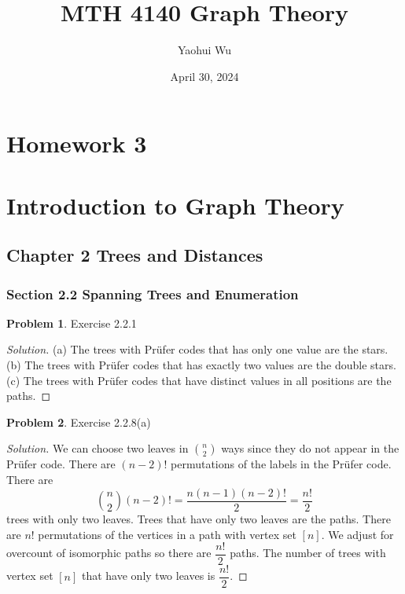\documentclass[12pt]{article}
\title{MTH 4140 Graph Theory}
\author{Yaohui Wu}
\date{April 30, 2024}
\theoremstyle{definition}
\newtheorem{problem}{Problem}
\newenvironment*{solution}{\begin{proof}[Solution]}{\end{proof}}
\begin{document}
\maketitle
\section*{Homework 3}
\section*{Introduction to Graph Theory}

\subsection*{Chapter 2 Trees and Distances}
\subsubsection*{Section 2.2 Spanning Trees and Enumeration}
\begin{problem}
    Exercise 2.2.1
\end{problem}
\begin{solution}
    (a) The trees with Prüfer codes that has only one value are the stars. (b)
    The trees with Prüfer codes that has exactly two values are the double
    stars. (c) The trees with Prüfer codes that have distinct values in all
    positions are the paths.
\end{solution}
\begin{problem}
    Exercise 2.2.8(a)
\end{problem}
\begin{solution}
    We can choose two leaves in \(\binom{n}{2}\) ways since they do not appear
    in the Prüfer code. There are \((n-2)!\) permutations of the labels in the
    Prüfer code. There are
    \[\binom{n}{2}(n-2)! = \frac{n(n-1)(n-2)!}{2} = \frac{n!}{2}\]
    trees with only two leaves. Trees that have only two leaves are
    the paths. There are \(n!\) permutations of the vertices in a path with
    vertex set \([n]\). We adjust for overcount of isomorphic paths so there
    are \(\dfrac{n!}{2}\) paths. The number of trees with vertex set \([n]\)
    that have only two leaves is \(\dfrac{n!}{2}\).
\end{solution}
\end{document}
